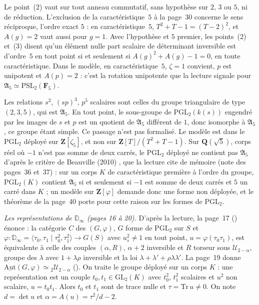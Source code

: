 \begin{remarque}
Le point~(2) vaut sur tout anneau commutatif, sans hypothèse sur $2$, $3$ ou $5$, ni de réduction. L'exclusion de la caractéristique~$5$ à la page~30 concerne le sens réciproque, l'ordre exact $5$ : en caractéristique~$5$, $T^2 + T - 1 = (T - 2)^2$, et $A(g) = 2$ vaut aussi pour $g = 1$. Avec l'hypothèse  et $5$ premier, les points~(2) et~(3) disent qu'un élément nulle part scalaire de déterminant inversible est d'ordre~$5$ en tout point si et seulement si $A(g)^2 + A(g) - 1 = 0$, en toute caractéristique. Dans le modèle, en caractéristique~$5$, $\zeta = 1$ convient, $p$ est unipotent et $A(p) = 2$ : c'est la rotation unipotente que la lecture signale pour $\mathfrak A_5 \simeq \mathrm{PSL}_2(\mathbf F_5)$.
\end{remarque}

\begin{remarque}
Les relations $s^2$, $(sp)^3$, $p^5$ scalaires sont celles du groupe triangulaire de type $(2, 3, 5)$, qui est $\mathfrak A_5$. En tout point, le sous-groupe de $\mathrm{PGL}_2(k(s))$ engendré par les images de $s$ et $p$ est un quotient de $\mathfrak A_5$ différent de $1$, donc isomorphe à $\mathfrak A_5$, ce groupe étant simple. Ce passage n'est pas formalisé. Le modèle est dans le $\mathrm{PGL}_2$ déployé sur $\mathbf Z[\zeta_5]$, et non sur $\mathbf Z[T]/(T^2 + T - 1)$. Sur $\mathbf Q(\sqrt 5)$, corps réel où $-1$ n'est pas somme de deux carrés, le $\mathrm{PGL}_2$ déployé ne contient pas $\mathfrak A_5$ d'après le critère de Beauville (2010) \cite{beauville2010}, que la lecture cite de mémoire (note des pages~36 et~37) : sur un corps $K$ de caractéristique première à l'ordre du groupe, $\mathrm{PGL}_2(K)$ contient $\mathfrak A_5$ si et seulement si $-1$ est somme de deux carrés et $5$ un carré dans $K$ ; un modèle sur $\mathbf Z[\varphi]$ demande donc une forme non déployée, et le théorème de la page~40 porte pour cette raison sur les formes de $\mathrm{PGL}_2$.
\end{remarque}

\noindent\emph{Les représentations de $\mathbb D_\infty$ (pages 16 à 20).} D'après la lecture, la page~17 () énonce : la catégorie $C$ des $(G, \varphi)$, $G$ forme de $\mathrm{PGL}_2$ sur $S$ et $\varphi : \mathbb D_\infty = \langle \tau_0, \tau_1 \mid \tau_0^2, \tau_1^2 \rangle \to G(S)$ avec $u_s^2 \neq 1$ en tout point, $u = \varphi(\tau_0\tau_1)$, est équivalente à celle des couples $(\alpha, R)$, $\alpha + 2$ inversible et $R$ torseur sous $\mathcal U_{2-\alpha}$, groupe des $\lambda$ avec $1 + \lambda\rho$ inversible et la loi $\lambda + \lambda' + \rho\lambda\lambda'$. La page~19 donne $\underline{\mathrm{Aut}}(G, \varphi) \simeq {}_2\mathcal U_{2-\alpha}$ (). On traite le groupe déployé sur un corps $K$ : une représentation est un couple $t_0, t_1 \in \mathrm{GL}_2(K)$ avec $t_0^2$, $t_1^2$ scalaires et $u^2$ non scalaire, $u = t_0 t_1$. Alors $t_0$ et $t_1$ sont de trace nulle et $\tau = \mathrm{Tr}\, u \neq 0$. On note $d = \det u$ et $\alpha = A(u) = \tau^2/d - 2$.

